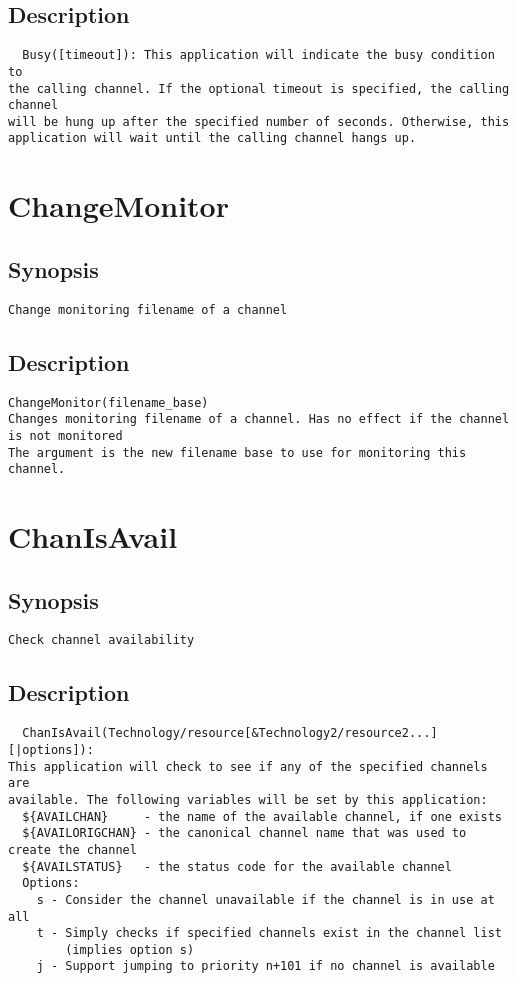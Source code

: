 \subsection{Description}
\begin{verbatim}
  Busy([timeout]): This application will indicate the busy condition to
the calling channel. If the optional timeout is specified, the calling channel
will be hung up after the specified number of seconds. Otherwise, this
application will wait until the calling channel hangs up.

\end{verbatim}


\section{ChangeMonitor}
\subsection{Synopsis}
\begin{verbatim}
Change monitoring filename of a channel
\end{verbatim}
\subsection{Description}
\begin{verbatim}
ChangeMonitor(filename_base)
Changes monitoring filename of a channel. Has no effect if the channel is not monitored
The argument is the new filename base to use for monitoring this channel.

\end{verbatim}


\section{ChanIsAvail}
\subsection{Synopsis}
\begin{verbatim}
Check channel availability
\end{verbatim}
\subsection{Description}
\begin{verbatim}
  ChanIsAvail(Technology/resource[&Technology2/resource2...][|options]): 
This application will check to see if any of the specified channels are
available. The following variables will be set by this application:
  ${AVAILCHAN}     - the name of the available channel, if one exists
  ${AVAILORIGCHAN} - the canonical channel name that was used to create the channel
  ${AVAILSTATUS}   - the status code for the available channel
  Options:
    s - Consider the channel unavailable if the channel is in use at all
    t - Simply checks if specified channels exist in the channel list
        (implies option s) 
    j - Support jumping to priority n+101 if no channel is available

\end{verbatim}


